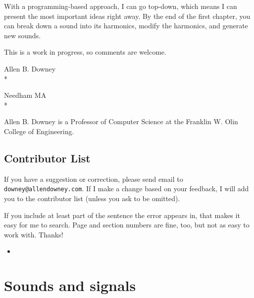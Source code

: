 \documentclass[12pt]{book}
\begin{document}
With a programming-based approach, I can go top-down, which means I
can present the most important ideas right away.  By the end of the
first chapter, you can break down a sound into its harmonics, modify
the harmonics, and generate new sounds.

This is a work in progress, so comments are welcome.


Allen B. Downey \\*

Needham MA \\*

Allen B. Downey is a Professor of Computer Science at 
the Franklin W. Olin College of Engineering.



\section*{Contributor List}

If you have a suggestion or correction, please send email to 
{\tt downey@allendowney.com}.  If I make a change based on your
feedback, I will add you to the contributor list
(unless you ask to be omitted).

If you include at least part of the sentence the
error appears in, that makes it easy for me to search.  Page and
section numbers are fine, too, but not as easy to work with.
Thanks!

\small

\begin{itemize}

\item 


\end{itemize}

\normalsize

\clearemptydoublepage

\begin{latexonly}

\tableofcontents

\clearemptydoublepage

\end{latexonly}

\mainmatter


\chapter{Sounds and signals}
\label{sounds}
\end{document}
